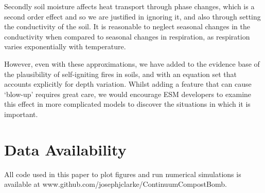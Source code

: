 Secondly soil moisture affects heat transport through phase changes, which is a second order effect and so we are justified in ignoring it, and also through setting the conductivity of the soil.
It is reasonable to neglect seasonal changes in the conductivity
when compared to seasonal changes in respiration, as respiration varies exponentially with temperature.

However, even with these approximations, we have added to the evidence base of the plausibility of self-igniting fires in soils, and with an equation set that accounts explicitly for depth variation.
Whilst adding a feature that can cause `blow-up' requires great care, we would encourage ESM developers to examine this effect in more complicated models to discover the situations in which it is important.

\section{Data Availability}
All code used in this paper to plot figures and run numerical simulations is available at www.github.com/josephjclarke/ContinuumCompostBomb.


